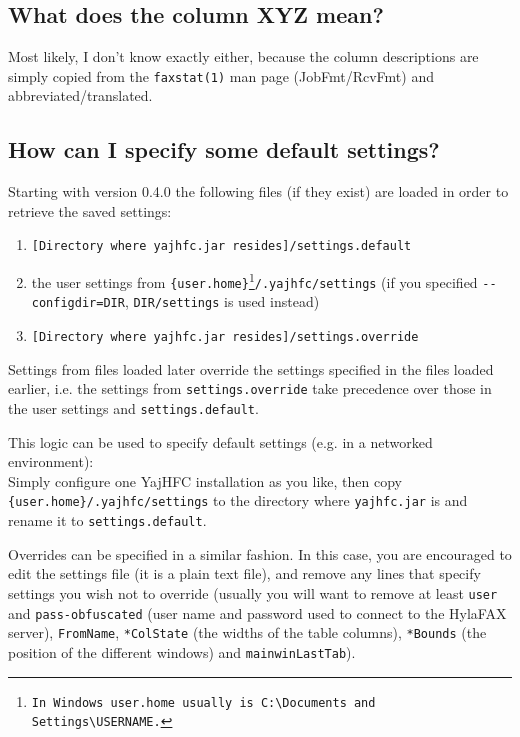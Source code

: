 \documentclass[a4paper,10pt]{scrartcl}
\begin{document}
\subsection{What does the column XYZ mean?}

Most likely, I don't know exactly either, because the column descriptions
are simply copied from the \verb.faxstat(1). man page (JobFmt/RcvFmt) and 
abbreviated/translated.

\subsection{How can I specify some default settings?}

Starting with version 0.4.0 the following files (if they exist) are loaded in order to retrieve the saved settings:
\begin{enumerate}
 \item \texttt{[Directory where yajhfc.jar resides]/settings.default}
 \item the user settings from \texttt{\{user.home\}\footnote{In Windows \texttt{user.home} usually is \texttt{C:\textbackslash Documents and Settings\textbackslash USERNAME}.}/.yajhfc/settings} (if you specified \texttt{-{-}configdir=DIR}, \texttt{DIR/settings} is used instead)
 \item \texttt{[Directory where yajhfc.jar resides]/settings.override}
\end{enumerate}

Settings from files loaded later override the settings specified in the files loaded earlier, i.e. the settings from \texttt{settings.override} take precedence over those in the user settings and \texttt{settings.default}.
\medskip

This logic can be used to specify default settings (e.g. in a networked environment): \\
Simply configure one YajHFC installation as you like, then copy \texttt{\{user.home\}/.yajhfc/settings} to the directory where \texttt{yajhfc.jar} is and rename it to \texttt{settings.default}.
\medskip

Overrides can be specified in a similar fashion. In this case, you are encouraged to edit the settings file (it is a plain text file), and remove any lines that specify settings you wish not to override (usually you will want to remove at least \texttt{user} and \texttt{pass-obfuscated} (user name and password used to connect to the HylaFAX server), \texttt{FromName}, \texttt{*ColState} (the widths of the table columns), \texttt{*Bounds} (the position of the different windows) and \texttt{mainwinLastTab}).
\end{document}
